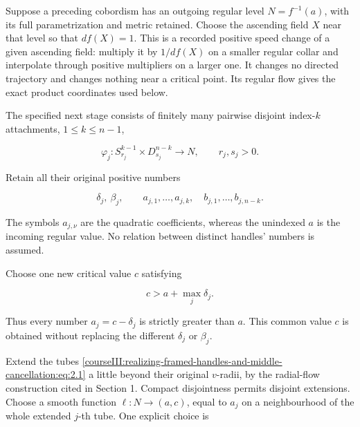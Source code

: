 \label{courseIII:realizing-framed-handles-and-middle-cancellation:section-2}\label{courseIII:middle-cancel:2}

Suppose a preceding cobordism has an outgoing regular level \(N=f^{-1}(a)\), with its full parametrization and metric retained. Choose the ascending field \(X\) near that level so that \(df(X)=1\). This is a recorded positive speed change of a given ascending field: multiply it by \(1/df(X)\) on a smaller regular collar and interpolate through positive multipliers on a larger one. It changes no directed trajectory and changes nothing near a critical point. Its regular flow gives the exact product coordinates used below.

The specified next stage consists of finitely many pairwise disjoint index-\(k\) attachments, \(1\leq k\leq n-1\),

\begin{equation}
\varphi_j:S^{k-1}_{r_j}\times D^{n-k}_{s_j}\longrightarrow N,
 \qquad r_j,s_j>0.
 \label{courseIII:realizing-framed-handles-and-middle-cancellation:eq:2.1}
\end{equation}

Retain all their original positive numbers

\begin{equation}
\delta_j,\ \beta_j,\qquad
 a_{j,1},\ldots,a_{j,k},\quad
 b_{j,1},\ldots,b_{j,n-k}.
 \label{courseIII:realizing-framed-handles-and-middle-cancellation:eq:2.2}
\end{equation}

The symbols \(a_{j,\nu}\) are the quadratic coefficients, whereas the unindexed \(a\) is the incoming regular value. No relation between distinct handles' numbers is assumed.

Choose one new critical value \(c\) satisfying

\begin{equation}
c>a+\max_j\delta_j.
 \label{courseIII:realizing-framed-handles-and-middle-cancellation:eq:2.3}
\end{equation}

Thus every number \(a_j=c-\delta_j\) is strictly greater than \(a\). This common value \(c\) is obtained without replacing the different \(\delta_j\) or \(\beta_j\).

Extend the tubes \eqref{courseIII:realizing-framed-handles-and-middle-cancellation:eq:2.1} a little beyond their original \(v\)-radii, by the radial-flow construction cited in Section 1. Compact disjointness permits disjoint extensions. Choose a smooth function \(\ell:N\to(a,c)\), equal to \(a_j\) on a neighbourhood of the whole extended \(j\)-th tube. One explicit choice is

